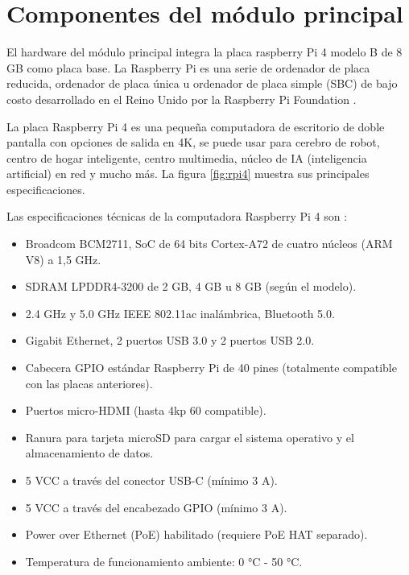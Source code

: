 \section{Componentes del módulo principal} 

El hardware del módulo principal integra la placa raspberry Pi 4 modelo B de 8 GB como placa base. La Raspberry Pi es una serie de ordenador de placa reducida, ordenador de placa única u ordenador de placa simple (SBC) de bajo costo desarrollado en el Reino Unido por la Raspberry Pi Foundation \citep{WEBSITE:6}.

La placa Raspberry Pi 4 es una pequeña computadora de escritorio de doble pantalla con opciones de salida en 4K, se puede usar para cerebro de robot, centro de hogar inteligente, centro multimedia, núcleo de IA (inteligencia artificial) en red y mucho más. La figura \ref{fig:rpi4} muestra sus principales especificaciones.

Las especificaciones técnicas de la computadora Raspberry Pi 4 son \citep{WEBSITE:7}:

\begin{itemize}
\item Broadcom BCM2711, SoC de 64 bits Cortex-A72 de cuatro núcleos (ARM V8) a 1,5 GHz.
\item SDRAM LPDDR4-3200 de 2 GB, 4 GB u 8 GB (según el modelo).
\item 2.4 GHz y 5.0 GHz IEEE 802.11ac inalámbrica, Bluetooth 5.0.
\item Gigabit Ethernet, 2 puertos USB 3.0 y 2 puertos USB 2.0.
\item Cabecera GPIO estándar Raspberry Pi de 40 pines (totalmente compatible con las placas anteriores).
\item Puertos micro-HDMI (hasta 4kp 60 compatible).
\item Ranura para tarjeta microSD para cargar el sistema operativo y el almacenamiento de datos.
\item 5 VCC a través del conector USB-C (mínimo 3 A).
\item 5 VCC a través del encabezado GPIO (mínimo 3 A).
\item Power over Ethernet (PoE) habilitado (requiere PoE HAT separado).
\item Temperatura de funcionamiento ambiente: 0 °C - 50 °C.
\end{itemize}

